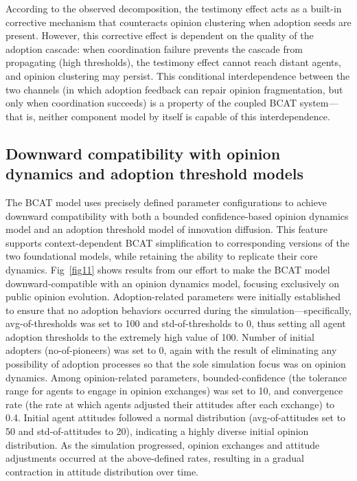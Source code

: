 \documentclass[10pt,letterpaper]{article}
\begin{document}
According to the observed decomposition, the testimony effect acts as a built-in corrective mechanism that counteracts opinion clustering when adoption seeds are present. However, this corrective effect is dependent on the quality of the adoption cascade: when coordination failure prevents the cascade from propagating (high thresholds), the testimony effect cannot reach distant agents, and opinion clustering may persist. This conditional interdependence between the two channels (in which adoption feedback can repair opinion fragmentation, but only when coordination succeeds) is a property of the coupled BCAT system---that is, neither component model by itself is capable of this interdependence.


\subsection*{Downward compatibility with opinion dynamics and adoption threshold models}

The BCAT model uses precisely defined parameter configurations to achieve downward compatibility with both a bounded confidence-based opinion dynamics model and an adoption threshold model of innovation diffusion. This feature supports context-dependent BCAT simplification to corresponding versions of the two foundational models, while retaining the ability to replicate their core dynamics. Fig~\ref{fig11} shows results from our effort to make the BCAT model downward-compatible with an opinion dynamics model, focusing exclusively on public opinion evolution. Adoption-related parameters were initially established to ensure that no adoption behaviors occurred during the simulation---specifically, avg-of-thresholds was set to 100 and std-of-thresholds to 0, thus setting all agent adoption thresholds to the extremely high value of 100. Number of initial adopters (no-of-pioneers) was set to 0, again with the result of eliminating any possibility of adoption processes so that the sole simulation focus was on opinion dynamics. Among opinion-related parameters, bounded-confidence (the tolerance range for agents to engage in opinion exchanges) was set to 10, and convergence rate (the rate at which agents adjusted their attitudes after each exchange) to 0.4. Initial agent attitudes followed a normal distribution (avg-of-attitudes set to 50 and std-of-attitudes to 20), indicating a highly diverse initial opinion distribution. As the simulation progressed, opinion exchanges and attitude adjustments occurred at the above-defined rates, resulting in a gradual contraction in attitude distribution over time.
\end{document}
